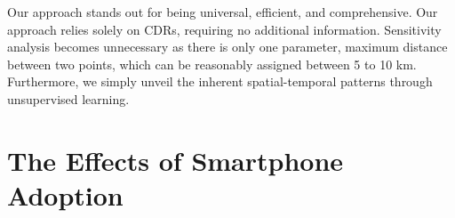 Our approach stands out for being universal, efficient, and comprehensive. Our approach relies solely on CDRs, requiring no additional information. Sensitivity analysis becomes unnecessary as there is only one parameter, maximum distance between two points, which can be reasonably assigned between 5 to 10 km. Furthermore, we simply unveil the inherent spatial-temporal patterns through unsupervised learning.

\section{The Effects of Smartphone Adoption}
